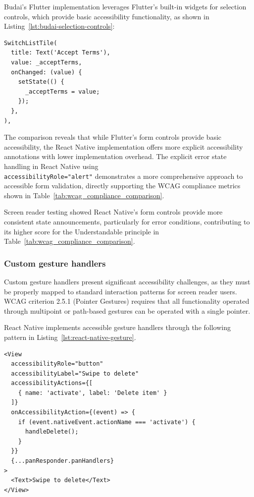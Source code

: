 {Budai's Flutter implementation leverages Flutter's built-in widgets for selection controls, which provide basic accessibility functionality, as shown in Listing~\ref{lst:budai-selection-controls}:

\begin{lstlisting}[style=DartStyle, caption=Selection controls in Budai's Flutter code, label=lst:budai-selection-controls]
SwitchListTile(
  title: Text('Accept Terms'),
  value: _acceptTerms,
  onChanged: (value) {
    setState(() {
      _acceptTerms = value;
    });
  },
),
\end{lstlisting}

\pagebreak

The comparison reveals that while Flutter's form controls provide basic accessibility, the React Native implementation offers more explicit accessibility annotations with lower implementation overhead. The explicit error state handling in React Native using \\ \texttt{accessibilityRole="alert"} demonstrates a more comprehensive approach to accessible form validation, directly supporting the WCAG compliance metrics shown in Table~\ref{tab:wcag_compliance_comparison}.

Screen reader testing showed React Native's form controls provide more consistent state announcements, particularly for error conditions, contributing to its higher score for the Understandable principle in Table~\ref{tab:wcag_compliance_comparison}.

\subsubsection{Custom gesture handlers}
\label{subsubsec:gesture-handlers}

Custom gesture handlers present significant accessibility challenges, as they must be properly mapped to standard interaction patterns for screen reader users. WCAG criterion 2.5.1 (Pointer Gestures) requires that all functionality operated through multipoint or path-based gestures can be operated with a single pointer.

React Native implements accessible gesture handlers through the following pattern in Listing~\ref{lst:react-native-gesture}.

\begin{lstlisting}[style=ReactNativeStyle, caption=Accessible gesture handler in React Native, label=lst:react-native-gesture]
<View
  accessibilityRole="button"
  accessibilityLabel="Swipe to delete"
  accessibilityActions={[
    { name: 'activate', label: 'Delete item' }
  ]}
  onAccessibilityAction={(event) => {
    if (event.nativeEvent.actionName === 'activate') {
      handleDelete();
    }
  }}
  {...panResponder.panHandlers}
>
  <Text>Swipe to delete</Text>
</View>
\end{lstlisting}

}
